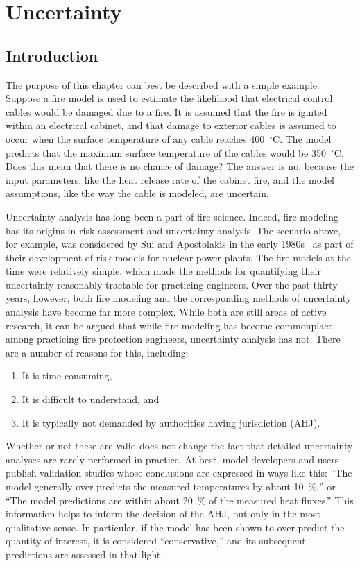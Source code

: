 
\newcommand{\paper}{chapter }

\chapter{Uncertainty}

\section{Introduction}

The purpose of this \paper can best be described with a simple example.
Suppose a fire model is used to estimate the likelihood that electrical control cables would be damaged due to
a fire.  It is assumed that the fire is ignited within an electrical cabinet, and that
damage to exterior cables is assumed to occur when the surface temperature of any cable reaches 400~$^\circ$C.
The model predicts that the maximum surface temperature of the cables would be 350~$^\circ$C.
Does this mean that there is no chance of damage? The answer is no, because the input parameters, like the heat release rate of
the cabinet fire, and the model assumptions, like the way the cable is modeled, are uncertain.

Uncertainty analysis has long been a part of fire science. Indeed, fire modeling has its origins in risk assessment and uncertainty analysis. The scenario above,
for example, was considered by Sui and Apostolakis in the early 1980s~\cite{Sui:RE1982} as part of their development of risk models for
nuclear power plants. The fire models at the
time were relatively simple, which made the methods for quantifying their uncertainty reasonably tractable for practicing engineers. Over the past
thirty years, however, both fire modeling and the corresponding methods of uncertainty analysis have become far more complex. While both are still
areas of active research, it can be argued that while fire modeling has become commonplace among practicing fire protection engineers, uncertainty
analysis has not. There are a number of reasons for this, including:
\begin{enumerate}
\item It is time-consuming,
\item It is difficult to understand, and
\item It is typically not demanded by authorities having jurisdiction (AHJ).
\end{enumerate}
Whether or not these are valid does not change the fact that detailed uncertainty analyses are rarely performed in practice. At best, model developers
and users publish validation studies whose conclusions are expressed in ways like this: ``The model generally over-predicts the measured temperatures
by about 10~\%,'' or ``The model predictions are within about 20~\% of the measured heat fluxes.'' This information helps to inform the decision of
the AHJ, but only in the most qualitative sense. In particular, if the model has been shown to over-predict the quantity of interest, it is considered
``conservative,'' and its subsequent predictions are assessed in that light.

